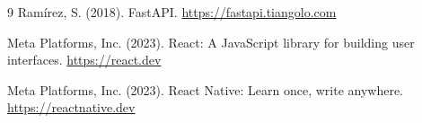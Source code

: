\begin{thebibliography}{9}
Ramírez, S. (2018). FastAPI. \url{https://fastapi.tiangolo.com}

Meta Platforms, Inc. (2023). React: A JavaScript library for building user interfaces. \url{https://react.dev}

Meta Platforms, Inc. (2023). React Native: Learn once, write anywhere. \url{https://reactnative.dev}
\end{thebibliography}
